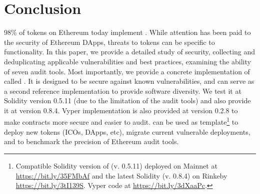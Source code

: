
\section{Conclusion}

98\% of tokens on Ethereum today implement \erc. While attention has been paid to the security of Ethereum DApps, threats to tokens can be specific to \erc functionality. In this paper, we provide a detailed study of \erc security, collecting and deduplicating applicable vulnerabilities and best practices, examining the ability of seven audit tools. Most importantly, we provide a concrete implementation of \erc called \sys. It is designed to be secure against known vulnerabilities, and can serve as a second reference implementation to provide software diversity. We test it at Solidity version 0.5.11 (due to the limitation of the audit tools) and also provide it at version 0.8.4. Vyper implementation is also provided at version 0.2.8 to make \erc contracts more secure and easier to audit. \sys can be used as template\footnote{Compatible Solidity version of \sys (v. 0.5.11) deployed on Mainnet at \url{https://bit.ly/35FMbAf} and the latest Solidity (v. 0.8.4) on Rinkeby \url{https://bit.ly/3tI139S}. Vyper code at \url{https://bit.ly/3dXaaPc}.} to deploy new \erc tokens (\eg ICOs, DApps, etc), migrate current vulnerable deployments, and to benchmark the precision of Ethereum audit tools.



